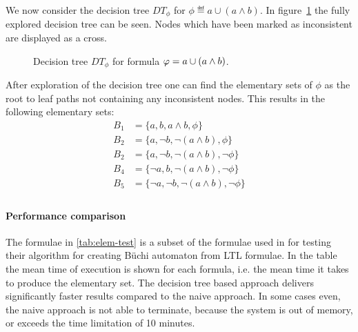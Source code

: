 \begin{example}
We now consider the decision tree $DT_\phi$ for $\phi \eqdef a \cup (a \land b)$. In figure~\ref{fig:elemset} the fully explored decision tree can be seen. Nodes which have been marked as inconsistent are displayed as a cross.
\begin{figure}[!ht]
\begin{center}
    
    \caption{Decision tree $DT_\phi$ for formula $\varphi = a \cup (a \land b)$.}
    \label{fig:elemset}
\end{center}
\end{figure}
After exploration of the decision tree one can find the elementary sets of $\phi$ as the root to leaf paths not containing any inconsistent nodes. This results in the following elementary sets:
\begin{align*}
    B_1 &= \{a,         b,         a\land b,           \phi\} \\
    B_2 &= \{a,         \lnot b,    \lnot (a\land b),   \phi\} \\
    B_2 &= \{a,         \lnot b,    \lnot (a\land b),   \lnot \phi\} \\
    B_4 &= \{\lnot a,   b,         \lnot (a\land b),  \lnot \phi\} \\
    B_5 &= \{\lnot a,   \lnot b,    \lnot (a\land b),   \lnot \phi\} \\
\end{align*}
\end{example}

\paragraph{Performance comparison}
The formulae in \autoref{tab:elem-test} is a subset of the formulae used in \cite[Tab.~1]{somenzi2000efficient} for testing their algorithm for creating Büchi automaton from LTL formulae. In the table the mean time of execution is shown for each formula, i.e. the mean time it takes to produce the elementary set. The decision tree based approach delivers significantly faster results compared to the naive approach. In some cases even, the naive approach is not able to terminate, because the system is out of memory, or exceeds the time limitation of 10 minutes.


